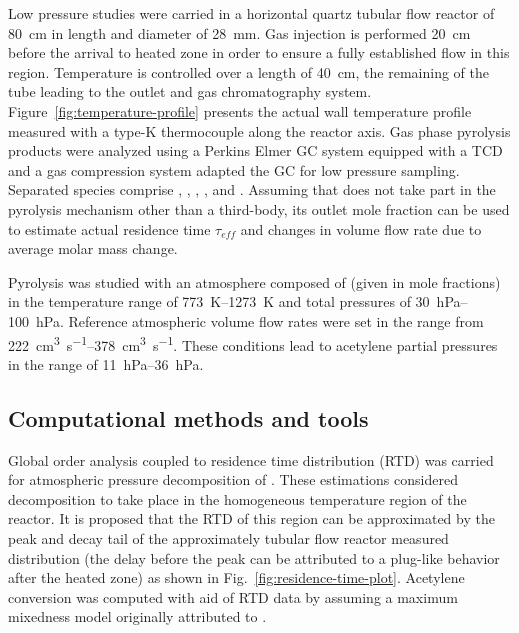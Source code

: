 \documentclass[final,3p,times,twocolumn,sort&compress]{elsarticle}
\begin{document}
Low pressure studies were carried in a horizontal quartz tubular flow reactor of \SI{80}{\centi\metre} in length and diameter of \SI{28}{\milli\metre}. Gas injection is performed \SI{20}{\centi\metre} before the arrival to heated zone in order to ensure a fully established flow in this region. Temperature is controlled over a length of \SI{40}{\centi\metre}, the remaining of the tube leading to the outlet and gas chromatography system. Figure~\ref{fig:temperature-profile} presents the actual wall temperature profile measured with a type-K thermocouple along the reactor axis. Gas phase pyrolysis products were analyzed using a Perkins Elmer GC system equipped with a TCD and a gas compression system adapted the GC for low pressure sampling. Separated species comprise , , , ,  and . Assuming that  does not take part in the pyrolysis mechanism other than a third-body, its outlet mole fraction can be used to estimate actual residence time $\tau_{eff}$ and changes in volume flow rate due to average molar mass change.

Pyrolysis was studied with an atmosphere composed of  (given in mole fractions) in the temperature range of \SIrange{773}{1273}{\kelvin} and total pressures of \SIrange{30}{100}{\hecto\pascal}. Reference atmospheric volume flow rates were set in the range from \SIrange{222}{378}{\cubic\centi\metre\per\second}. These conditions lead to acetylene partial pressures in the range of \SIrange{11}{36}{\hecto\pascal}.

\subsection{Computational methods and tools}

Global order analysis coupled to residence time distribution (RTD) was carried for atmospheric pressure decomposition of . These estimations considered decomposition to take place in the homogeneous temperature region of the reactor. It is proposed that the RTD of this region can be approximated by the peak and decay tail of the approximately tubular flow reactor measured distribution (the delay before the peak can be attributed to a plug-like behavior after the heated zone) as shown in Fig.~\ref{fig:residence-time-plot}. Acetylene conversion was computed with aid of RTD data by assuming a maximum mixedness model originally attributed to \citet{Zwietering1959}.
\end{document}
